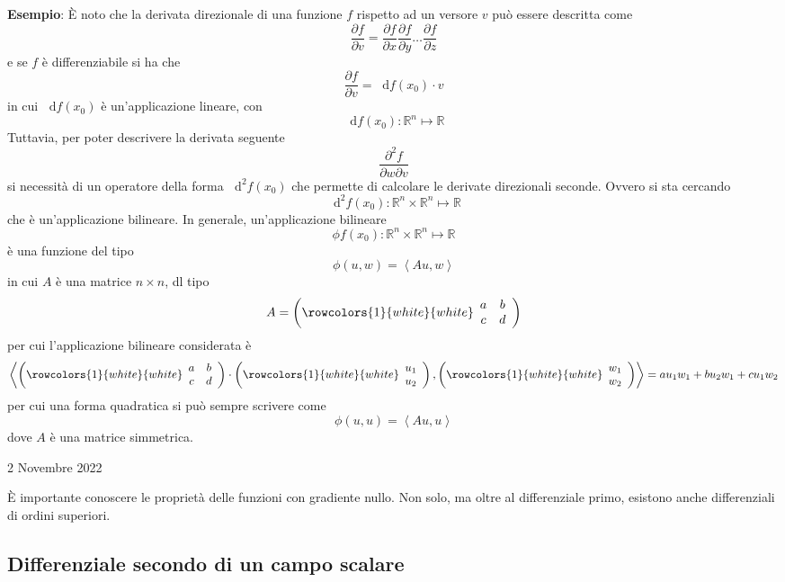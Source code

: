 \documentclass[a4paper]{extarticle}
\newcommand*\dif{\mathop{}\!\mathrm{d}}
\begin{document}
\vspace{2em}
\noindent
\textbf{Esempio}: È noto che la derivata direzionale di una funzione $f$ rispetto ad un versore $v$ può essere descritta come
\[\dfrac{\partial f}{\partial v} = \dfrac{\partial f}{\partial x}\dfrac{\partial f}{\partial y} \dots \dfrac{\partial f}{\partial z}\]
e se $f$ è differenziabile si ha che
\[\dfrac{\partial f}{\partial v} = \dif f(x_0) \cdot v\]
in cui $\dif f(x_0)$ è un'applicazione lineare, con
\[\dif f(x_0) : \mathbb{R}^n \longmapsto \mathbb{R}\]
Tuttavia, per poter descrivere la derivata seguente
\[\dfrac{\partial^2 f}{\partial w \partial v}\]
si necessità di un operatore della forma $\dif^2 f(x_0)$ che permette di calcolare le derivate direzionali seconde. Ovvero si sta cercando
\[\dif^2 f(x_0) : \mathbb{R}^n \times \mathbb{R}^n \longmapsto \mathbb{R}\]
che è un'applicazione bilineare. In generale, un'applicazione bilineare
\[\phi f(x_0) : \mathbb{R}^n \times \mathbb{R}^n \longmapsto \mathbb{R}\]
è una funzione del tipo
\[\phi(u,w) = \left<Au,w\right>\]
in cui $A$ è una matrice $n \times n$, dl tipo
\[A = \left(\rowcolors{1}{white}{white}    
\begin{array}{cc}
    a & b\\
    c & d
\end{array}\right)\]
per cui l'applicazione bilineare considerata è
\[\left<
    \left(\rowcolors{1}{white}{white}    
\begin{array}{cc}
    a & b\\
    c & d
\end{array}\right) \cdot
\left(\rowcolors{1}{white}{white}    
\begin{array}{c}
    u_1\\
    u_2
\end{array}\right),
\left(\rowcolors{1}{white}{white}    
\begin{array}{c}
    w_1\\
    w_2
\end{array}\right)
\right> = au_1w_1+bu_2w_1+cu_1w_2\]
per cui una forma quadratica si può sempre scrivere come
\[\phi(u,u) = \left<Au,u\right>\]
dove $A$ è una matrice simmetrica.

\newpage
\noindent
\begin{center}
    2 Novembre 2022
\end{center}
È importante conoscere le proprietà delle funzioni con gradiente nullo. Non solo, ma oltre al differenziale primo, esistono anche differenziali di ordini superiori.

\subsection{Differenziale secondo di un campo scalare}
\end{document}
